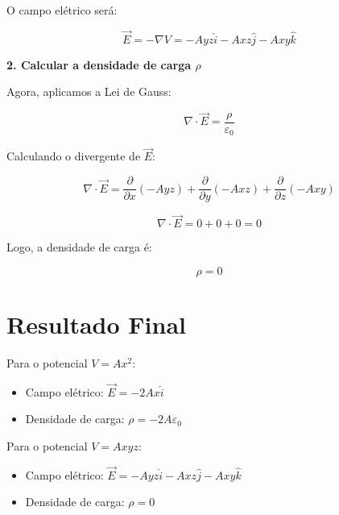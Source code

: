 \documentclass[a4paper,12pt]{article}
\begin{document}
\begin{flushleft}
O campo elétrico será:

\begin{equation}
\vec{E} = -\nabla V = - A y z \hat{i} - A x z \hat{j} - A x y \hat{k}
\end{equation}

\textbf{2. Calcular a densidade de carga \( \rho \)}

Agora, aplicamos a Lei de Gauss:

\begin{equation}
\boxed{\nabla \cdot \vec{E} = \frac{\rho}{\varepsilon_0}}
\end{equation}

Calculando o divergente de \( \vec{E} \):

\begin{equation}
\nabla \cdot \vec{E} = \frac{\partial}{\partial x} (- A y z) + \frac{\partial}{\partial y} (- A x z) + \frac{\partial}{\partial z} (- A x y)
\end{equation}

\begin{equation}
\nabla \cdot \vec{E} = 0 + 0 + 0 = 0
\end{equation}

Logo, a densidade de carga é:

\begin{equation}
\boxed{\rho = 0}
\end{equation}

\section*{Resultado Final}

Para o potencial \( V = A x^2 \):
\begin{itemize}
\item Campo elétrico: \( \vec{E} = - 2 A x \hat{i} \)
\item Densidade de carga: \( \rho = - 2 A \varepsilon_0 \)
\end{itemize}

Para o potencial \( V = A x y z \):

\begin{itemize}
\item Campo elétrico: \( \vec{E} = - A y z \hat{i} - A x z \hat{j} - A x y \hat{k} \)
\item Densidade de carga: \( \rho = 0 \)
\end{itemize}

\end{flushleft}
\end{document}
